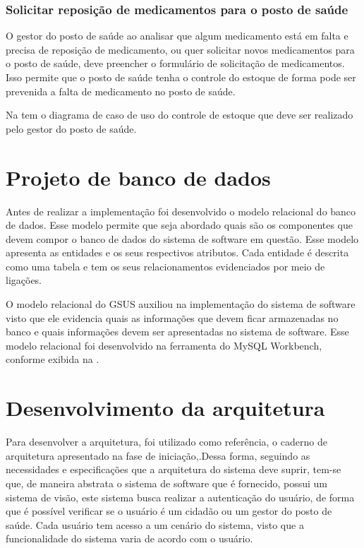 \subsubsection{Solicitar reposição de medicamentos para o posto de saúde}

O gestor do posto de saúde ao analisar que algum medicamento está em falta e precisa de reposição de medicamento, ou quer solicitar novos medicamentos para o posto de saúde, deve preencher o formulário de solicitação de medicamentos. Isso permite que o posto de saúde tenha o controle do estoque de forma pode ser prevenida a falta de medicamento no posto de saúde.

Na  tem o diagrama de caso de uso do controle de estoque que deve ser realizado pelo gestor do posto de saúde.

%

\section{Projeto de banco de dados}

Antes de realizar a implementação foi desenvolvido o modelo relacional do banco de dados. Esse modelo permite que seja abordado quais são os componentes que devem compor o banco de dados do sistema de software em questão. Esse modelo apresenta as entidades e os seus respectivos atributos. Cada entidade é descrita como uma tabela e tem os seus relacionamentos evidenciados por meio de ligações.

O modelo relacional do GSUS auxiliou na implementação do sistema de software visto que ele evidencia quais as informações que devem ficar armazenadas no banco e quais informações devem ser apresentadas no sistema de software. Esse modelo relacional foi desenvolvido na ferramenta do MySQL Workbench, conforme exibida na .


%


\section{Desenvolvimento da arquitetura}

Para desenvolver a arquitetura, foi utilizado como referência, o caderno de arquitetura apresentado na fase de iniciação,.Dessa forma, seguindo as necessidades e especificações que a arquitetura do sistema deve suprir, tem-se que, de maneira abstrata o sistema de software que é fornecido, possui um sistema de visão, este sistema busca realizar a autenticação do usuário, de forma que é possível verificar se o usuário é um cidadão ou um gestor do posto de saúde. Cada usuário tem acesso a um cenário do sistema, visto que a funcionalidade do sistema varia de acordo com o usuário. 

